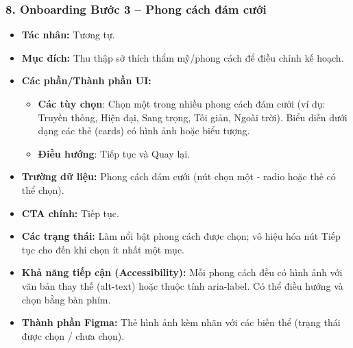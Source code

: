 \documentclass[11pt,a4paper]{article}
\begin{document}
\subsubsection{8. Onboarding Bước 3 – Phong cách đám cưới}
\begin{itemize}
    \item \textbf{Tác nhân:} Tương tự.
    \item \textbf{Mục đích:} Thu thập sở thích thẩm mỹ/phong cách để điều chỉnh kế hoạch.
    \item \textbf{Các phần/Thành phần UI:}
    \begin{itemize}
        \item \textbf{Các tùy chọn}: Chọn một trong nhiều phong cách đám cưới (ví dụ: Truyền thống, Hiện đại, Sang trọng, Tối giản, Ngoài trời). Biểu diễn dưới dạng các thẻ (cards) có hình ảnh hoặc biểu tượng.
        \item \textbf{Điều hướng}: Tiếp tục và Quay lại.
    \end{itemize}
    \item \textbf{Trường dữ liệu:} Phong cách đám cưới (nút chọn một - radio hoặc thẻ có thể chọn).
    \item \textbf{CTA chính:} Tiếp tục.
    \item \textbf{Các trạng thái:} Làm nổi bật phong cách được chọn; vô hiệu hóa nút Tiếp tục cho đến khi chọn ít nhất một mục.
    \item \textbf{Khả năng tiếp cận (Accessibility):} Mỗi phong cách đều có hình ảnh với văn bản thay thế (alt-text) hoặc thuộc tính aria-label. Có thể điều hướng và chọn bằng bàn phím.
    \item \textbf{Thành phần Figma:} Thẻ hình ảnh kèm nhãn với các biến thể (trạng thái được chọn / chưa chọn).
\end{itemize}
\end{document}

